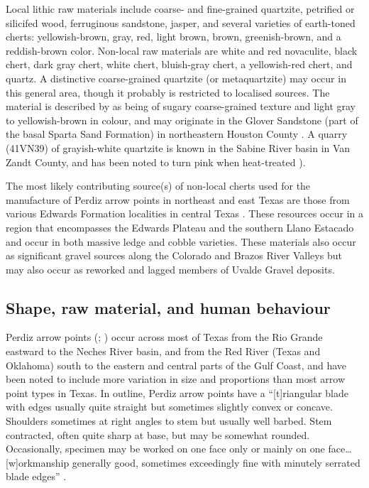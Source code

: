 \documentclass[review]{elsarticle}
\begin{document}
Local lithic raw materials include coarse- and fine-grained quartzite, petrified or silicifed wood, ferruginous sandstone, jasper, and several varieties of earth-toned cherts: yellowish-brown, gray, red, light brown, brown, greenish-brown, and a reddish-brown color. Non-local raw materials are white and red novaculite, black chert, dark gray chert, white chert, bluish-gray chert, a yellowish-red chert, and quartz. A distinctive coarse-grained quartzite (or metaquartzite) may occur in this general area, though it probably is restricted to localised sources. The material is described by \citet[67]{RN1253} as being of sugary coarse-grained texture and light gray to yellowish-brown in colour, and may originate in the Glover Sandstone (part of the basal Sparta Sand Formation) in northeastern Houston County \cite[69]{RN1253}. A quarry (41VN39) of grayish-white quartzite is known in the Sabine River basin in Van Zandt County, and has been noted to turn pink when heat-treated \cite{RN1898}).

The most likely contributing source(s) of non-local cherts used for the manufacture of Perdiz arrow points in northeast and east Texas are those from various Edwards Formation localities in central Texas \citep{RN439,RN2145}. These resources occur in a region that encompasses the Edwards Plateau and the southern Llano Estacado and occur in both massive ledge and cobble varieties. These materials also occur as significant gravel sources along the Colorado and Brazos River Valleys but may also occur as reworked and lagged members of Uvalde Gravel deposits.

\subsection*{Shape, raw material, and human behaviour}

Perdiz arrow points (\citealp[283 and Plate 142]{RN7795}; \citealp[504 and Plate 131]{RN5769}) occur across most of Texas from the Rio Grande eastward to the Neches River basin, and from the Red River (Texas and Oklahoma) south to the eastern and central parts of the Gulf Coast, and have been noted to include more variation in size and proportions than most arrow point types in Texas. In outline, Perdiz arrow points have a “[t]riangular blade with edges usually quite straight but sometimes slightly convex or concave. Shoulders sometimes at right angles to stem but usually well barbed. Stem contracted, often quite sharp at base, but may be somewhat rounded. Occasionally, specimen may be worked on one face only or mainly on one face…[w]orkmanship generally good, sometimes exceedingly fine with minutely serrated blade edges” \cite[504]{RN5769}. 
\end{document}

